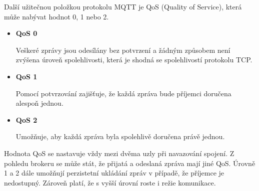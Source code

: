   Další užitečnou položkou protokolu MQTT je QoS (Quality of Service),
  která může nabývat hodnot 0, 1 nebo 2.
  
   \begin{itemize}
    \item \textbf{QoS 0}
    
    Veškeré zprávy jsou odesílány bez potvrzení a žádným způsobem
    není zvýšena úroveň spolehlivosti, která je shodná se spolehlivostí protokolu TCP.
    
    \item \textbf{QoS 1}
    
    Pomocí potvrzování zajišťuje, že každá zpráva bude příjemci doručena alespoň jednou.
    
    \item \textbf{QoS 2}
    
     Umožňuje, aby každá zpráva byla spolehlivě doručena právě jednou.
   \end{itemize}
  Hodnota QoS se nastavuje vždy mezi dvěma uzly při navazování spojení.
  Z pohledu brokeru se může stát, že přijatá a odeslaná zpráva mají jiné QoS.
  Úrovně 1 a 2 dále umožňují perzistetní ukládání zpráv v případě, že příjemce je
  nedostupný. Zároveň platí, že s vyšší úrovní roste i režie komunikace. \cite{mqtt_intro}
